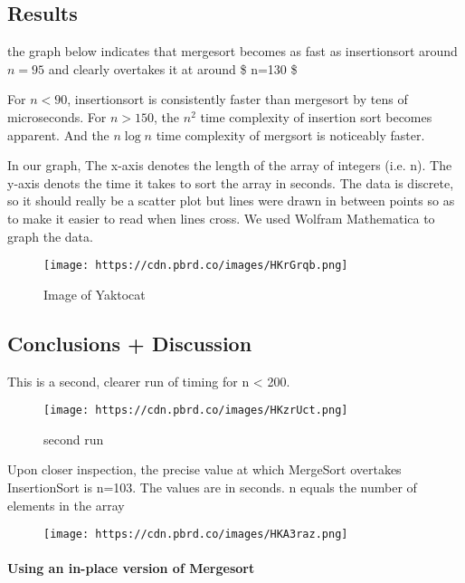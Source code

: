 \documentclass[11pt]{article}
\makeatletter
\def\maxwidth{\ifdim\Gin@nat@width>\linewidth\linewidth
    \else\Gin@nat@width\fi}
\let\Oldincludegraphics\includegraphics
\renewcommand{\includegraphics}[1]{\Oldincludegraphics[width=.8\maxwidth]{#1}}
\makeatother
\begin{document}
    \subsection{Results}\label{results}

the graph below indicates that mergesort becomes as fast as
insertionsort around \(n=95\) and clearly overtakes it at around \$
n=130 \$

For \(n < 90\), insertionsort is consistently faster than mergesort by
tens of microseconds. For \(n > 150\), the \(n^2\) time complexity of
insertion sort becomes apparent. And the \(n \log{n}\) time complexity
of mergsort is noticeably faster.

In our graph, The x-axis denotes the length of the array of integers
(i.e. n). The y-axis denots the time it takes to sort the array in
seconds. The data is discrete, so it should really be a scatter plot but
lines were drawn in between points so as to make it easier to read when
lines cross. We used Wolfram Mathematica to graph the data.

    \begin{figure}
\centering
\texttt{[image: https://cdn.pbrd.co/images/HKrGrqb.png]}
\caption{Image of Yaktocat}
\end{figure}

    \subsection{Conclusions + Discussion}\label{conclusions-discussion}

    This is a second, clearer run of timing for n \textless{} 200.

\begin{figure}
\centering
\texttt{[image: https://cdn.pbrd.co/images/HKzrUct.png]}
\caption{second run}
\end{figure}

    Upon closer inspection, the precise value at which MergeSort overtakes
InsertionSort is n=103. The values are in seconds. n equals the number
of elements in the array

\begin{figure}
\centering
\texttt{[image: https://cdn.pbrd.co/images/HKA3raz.png]}
\caption{}
\end{figure}

    \paragraph{Using an in-place version of
Mergesort}\label{using-an-in-place-version-of-mergesort}
\end{document}

